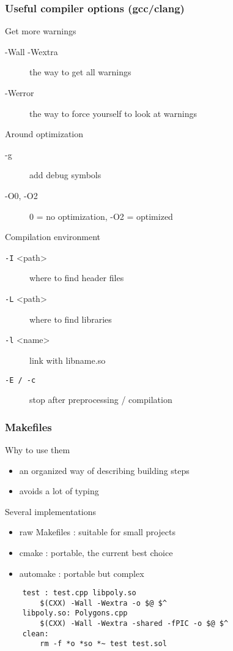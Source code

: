 \begin{frame}[fragile]
  \frametitle{Useful compiler options (gcc/clang)}
  \begin{block}{Get more warnings}
    \begin{description}
      \item[-Wall -Wextra] the way to get all warnings
      \item[-Werror] the way to force yourself to look at warnings
    \end{description}
  \end{block}
  \begin{block}{Around optimization}
    \begin{description}
      \item[-g] add debug symbols
      \item[-O0, -O2] 0 = no optimization, -O2 = optimized
    \end{description}
  \end{block}
  \begin{block}{Compilation environment}
    \begin{description}
      \item[\texttt{-I} \textless{}path\textgreater] where to find header files
      \item[\texttt{-L} \textless{}path\textgreater] where to find libraries
      \item[\texttt{-l} \textless{}name\textgreater] link with libname.so
      \item[\texttt{-E / -c}] stop after preprocessing / compilation
    \end{description}
  \end{block}
\end{frame}

\begin{frame}[fragile]
  \frametitle{Makefiles}
  \begin{block}{Why to use them}
    \begin{itemize}
    \item an organized way of describing building steps
    \item avoids a lot of typing
    \end{itemize}
  \end{block}
  \begin{block}{Several implementations}
    \begin{itemize}
    \item raw Makefiles : suitable for small projects
    \item cmake : portable, the current best choice
    \item automake : portable but complex
      \end{itemize}
  \end{block}
  \begin{verbatim}
    test : test.cpp libpoly.so
        $(CXX) -Wall -Wextra -o $@ $^
    libpoly.so: Polygons.cpp
        $(CXX) -Wall -Wextra -shared -fPIC -o $@ $^
    clean:
        rm -f *o *so *~ test test.sol
  \end{verbatim}
\end{frame}

